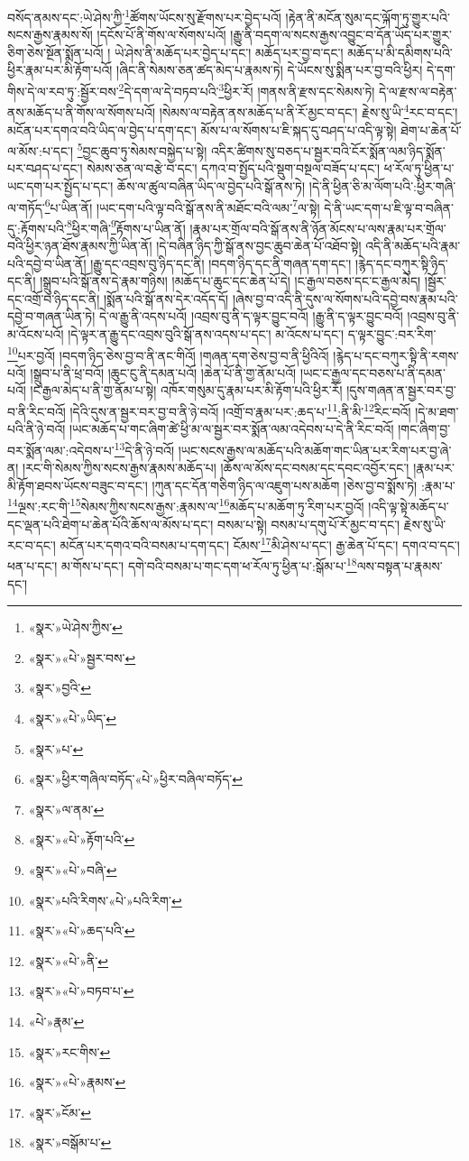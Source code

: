 བསོད་ནམས་དང་:ཡེ་ཤེས་ཀྱི་\footnote{«སྣར་»ཡེ་ཤེས་ཀྱིས་}ཚོགས་ཡོངས་སུ་རྫོགས་པར་བྱེད་པའོ། །རྟེན་ནི་མངོན་སུམ་དང་ལྐོག་ཏུ་གྱུར་པའི་སངས་རྒྱས་རྣམས་སོ། །དངོས་པོ་ནི་གོས་ལ་སོགས་པའོ། །རྒྱུ་ནི་བདག་ལ་སངས་རྒྱས་འབྱུང་བ་དོན་ཡོད་པར་གྱུར་ཅིག་ཅེས་སྔོན་སྨོན་པའོ། །
ཡེ་ཤེས་ནི་མཆོད་པར་བྱེད་པ་དང་། མཆོད་པར་བྱ་བ་དང་། མཆོད་པ་མི་དམིགས་པའི་ཕྱིར་རྣམ་པར་མི་རྟོག་པའོ། །ཞིང་ནི་སེམས་ཅན་ཚད་མེད་པ་རྣམས་ཏེ། དེ་ཡོངས་སུ་སྨིན་པར་བྱ་བའི་ཕྱིར། དེ་དག་གིས་དེ་ལ་རབ་ཏུ་:སྦྱོར་བས་\footnote{«སྣར་»«པེ་»སྦྱར་བས་}དེ་དག་ལ་དེ་བཏབ་པའི་\footnote{«སྣར་»བྱའི་}ཕྱིར་རོ། །གནས་ནི་རྫས་དང་སེམས་ཏེ། དེ་ལ་རྫས་ལ་བརྟེན་ནས་མཆོད་པ་ནི་གོས་ལ་སོགས་པའོ། །སེམས་ལ་བརྟེན་ནས་མཆོད་པ་ནི་རོ་མྱང་བ་དང་། རྗེས་སུ་ཡི་\footnote{«སྣར་»«པེ་»ཡིད་}རང་བ་དང་། མངོན་པར་དགའ་བའི་ཡིད་ལ་བྱེད་པ་དག་དང་། མོས་པ་ལ་སོགས་པ་ཇི་སྐད་དུ་བཤད་པ་འདི་ལྟ་སྟེ། ཐེག་པ་ཆེན་པོ་ལ་མོས་:པ་དང་། \footnote{«སྣར་»པ་}བྱང་ཆུབ་ཏུ་སེམས་བསྐྱེད་པ་སྟེ། འདིར་ཚིགས་སུ་བཅད་པ་སྦྱར་བའི་ངོར་སྨོན་ལམ་ཉིད་སྨོན་པར་བཤད་པ་དང་། སེམས་ཅན་ལ་བརྩེ་བ་དང་། དཀའ་བ་སྤྱོད་པའི་སྡུག་བསྔལ་བཟོད་པ་དང་། ཕ་རོལ་ཏུ་ཕྱིན་པ་ཡང་དག་པར་སྤྱོད་པ་དང་། ཆོས་ལ་ཚུལ་བཞིན་ཡིད་ལ་བྱེད་པའི་སྒོ་ནས་ཏེ། །དེ་ནི་ཕྱིན་ཅི་མ་ལོག་པའི་:ཕྱིར་གཞི་ལ་གཏོད་\footnote{«སྣར་»ཕྱིར་གཞིལ་བཏོད་«པེ་»ཕྱིར་བཞིལ་བཏོད་}པ་ཡིན་ནོ། །ཡང་དག་པའི་ལྟ་བའི་སྒོ་ནས་ནི་མཐོང་བའི་ལམ་\footnote{«སྣར་»ལ་ནམ་}ལ་སྟེ། དེ་ནི་ཡང་དག་པ་ཇི་ལྟ་བ་བཞིན་དུ་:རྟོགས་པའི་\footnote{«སྣར་»«པེ་»རྟོག་པའི་}ཕྱིར་གཞི་\footnote{«སྣར་»«པེ་»བཞི་}རྟོགས་པ་ཡིན་ནོ། །རྣམ་པར་གྲོལ་བའི་སྒོ་ནས་ནི་ཉོན་མོངས་པ་ལས་རྣམ་པར་གྲོལ་བའི་ཕྱིར་ཉན་ཐོས་རྣམས་ཀྱི་ཡིན་ནོ། །དེ་བཞིན་ཉིད་ཀྱི་སྒོ་ནས་བྱང་ཆུབ་ཆེན་པོ་འཐོབ་སྟེ། འདི་ནི་མཆོད་པའི་རྣམ་པའི་དབྱེ་བ་ཡིན་ནོ། །རྒྱུ་དང་འབྲས་བུ་ཉིད་དང་ནི། །བདག་ཉིད་དང་ནི་གཞན་དག་དང་། །རྙེད་དང་བཀུར་སྟི་ཉིད་དང་ནི། །སྒྲུབ་པའི་སྒོ་ནས་དེ་རྣམ་གཉིས། །མཆོད་པ་ཆུང་དང་ཆེན་པོ་དེ། །ང་རྒྱལ་བཅས་དང་ང་རྒྱལ་མེད། །སྦྱོར་དང་འགྲོ་བ་ཉིད་དང་ནི། །སྨོན་པའི་སྒོ་ནས་དེར་འདོད་དོ། །ཞེས་བྱ་བ་འདི་ནི་དུས་ལ་སོགས་པའི་དབྱེ་བས་རྣམ་པའི་དབྱེ་བ་གཞན་ཡིན་ཏེ། དེ་ལ་རྒྱུ་ནི་འདས་པའོ། །འབྲས་བུ་ནི་ད་ལྟར་བྱུང་བའོ། །རྒྱུ་ནི་ད་ལྟར་བྱུང་བའོ། །འབྲས་བུ་ནི་མ་འོངས་པའོ། །དེ་ལྟར་ན་རྒྱུ་དང་འབྲས་བུའི་སྒོ་ནས་འདས་པ་དང་། མ་འོངས་པ་དང་། ད་ལྟར་བྱུང་:བར་རིག་\footnote{«སྣར་»པའི་རིགས་«པེ་»པའི་རིག་}པར་བྱའོ། །བདག་ཉིད་ཅེས་བྱ་བ་ནི་ནང་གིའོ། །གཞན་དག་ཅེས་བྱ་བ་ནི་ཕྱིའིའོ། །རྙེད་པ་དང་བཀུར་སྟི་ནི་རགས་པའོ། །སྒྲུབ་པ་ནི་ཕྲ་བའོ། །ཆུང་ངུ་ནི་དམན་པའོ། །ཆེན་པོ་ནི་གྱ་ནོམ་པའོ། །ཡང་ང་རྒྱལ་དང་བཅས་པ་ནི་དམན་པའོ། །ང་རྒྱལ་མེད་པ་ནི་གྱ་ནོམ་པ་སྟེ། འཁོར་གསུམ་དུ་རྣམ་པར་མི་རྟོག་པའི་ཕྱིར་རོ། །དུས་གཞན་ན་སྦྱར་བར་བྱ་བ་ནི་རིང་བའོ། །དེའི་དུས་ན་སྦྱར་བར་བྱ་བ་ནི་ཉེ་བའོ། །འགྲོ་བ་རྣམ་པར་:ཆད་པ་\footnote{«སྣར་»«པེ་»ཆད་པའི་}:ནི་མི་\footnote{«སྣར་»«པེ་»ནི་}རིང་བའོ། །དེ་མ་ཐག་པའི་ནི་ཉེ་བའོ། །ཡང་མཆོད་པ་གང་ཞིག་ཚེ་ཕྱི་མ་ལ་སྦྱར་བར་སྨོན་ལམ་འདེབས་པ་དེ་ནི་རིང་བའོ། །གང་ཞིག་བྱ་བར་སྨོན་ལམ་:འདེབས་པ་\footnote{«སྣར་»«པེ་»བཏབ་པ་}དེ་ནི་ཉེ་བའོ། །ཡང་སངས་རྒྱས་ལ་མཆོད་པའི་མཆོག་གང་ཡིན་པར་རིག་པར་བྱ་ཞེ་ན། །རང་གི་སེམས་ཀྱིས་སངས་རྒྱས་རྣམས་མཆོད་པ། །ཆོས་ལ་མོས་དང་བསམ་དང་དབང་འབྱོར་དང་། །རྣམ་པར་མི་རྟོག་ཐབས་ཡོངས་བཟུང་བ་དང་། །ཀུན་དང་དོན་གཅིག་ཉིད་ལ་འཇུག་པས་མཆོག །ཅེས་བྱ་བ་སྨོས་ཏེ། :རྣམ་པ་\footnote{«པེ་»རྣམ་}ལྔས་:རང་གི་\footnote{«སྣར་»རང་གིས་}སེམས་ཀྱིས་སངས་རྒྱས་:རྣམས་ལ་\footnote{«སྣར་»«པེ་»རྣམས་}མཆོད་པ་མཆོག་ཏུ་རིག་པར་བྱའོ། །འདི་ལྟ་སྟེ་མཆོད་པ་དང་ལྡན་པའི་ཐེག་པ་ཆེན་པོའི་ཆོས་ལ་མོས་པ་དང་། བསམ་པ་སྟེ། བསམ་པ་དགུ་པོ་རོ་མྱང་བ་དང་། རྗེས་སུ་ཡི་རང་བ་དང་། མངོན་པར་དགའ་བའི་བསམ་པ་དག་དང་། ངོམས་\footnote{«སྣར་»ངོམ་}མི་ཤེས་པ་དང་། རྒྱ་ཆེན་པོ་དང་། དགའ་བ་དང་། ཕན་པ་དང་། མ་གོས་པ་དང་། དགེ་བའི་བསམ་པ་གང་དག་ཕ་རོལ་ཏུ་ཕྱིན་པ་:སྒོམ་པ་\footnote{«སྣར་»བསྒོམ་པ་}ལས་བསྟན་པ་རྣམས་དང་། 